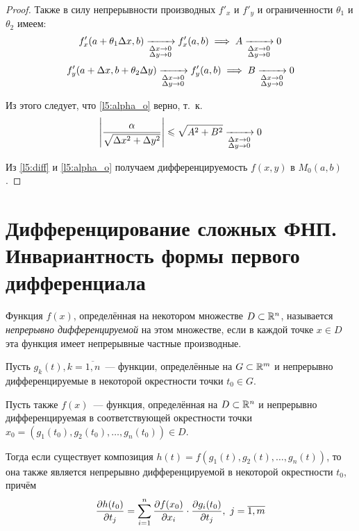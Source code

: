 \documentclass[../../main.tex]{subfiles}
\begin{document}
\begin{proof}
Также в силу непрерывности производных $f'_x$ и $f'_y$ 
и ограниченности $\theta_1$ и $\theta_2$ имеем:
\[f'_x(a+\theta_1\Delta x,b)\xrightarrow[\substack{\Delta x\to 0 \\
\Delta y \to 0}]{} f'_x(a,b)
\implies A \xrightarrow[\substack{\Delta x\to 0 \\
\Delta y \to 0}]{} 0\]
\[f'_y(a+\Delta x, b+\theta_2\Delta y) \xrightarrow[\substack{\Delta x\to 0 \\
\Delta y \to 0}]{} f'_y(a,b)
\implies B \xrightarrow[\substack{\Delta x\to 0 \\\Delta y \to 0}]{} 0\]

Из этого следует, что \eqref{l5:alpha_o} верно, т.~к.
\[\left|{\frac{\alpha}{\sqrt{\Delta x^2 + \Delta y^2}}}\right| \leqslant
\sqrt{A^2+B^2} \xrightarrow[\substack{\Delta x\to 0 \\
\Delta y \to 0}]{} 0\]

Из \eqref{l5:diff} и \eqref{l5:alpha_o} получаем дифференцируемость
$f(x,y)$ в $M_0(a,b)$.
\end{proof}

\section{Дифференцирование сложных ФНП. Инвариантность 
формы первого дифференциала}
\begin{defn}
Функция $f(x)$, определённая на некотором множестве $D\subset\mathbb{R}^n$,
называется \emph{непрерывно дифференцируемой} на 
этом множестве, если в каждой точке $x\in D$
 эта функция имеет непрерывные частные производные.
\end{defn}
\begin{thm}
Пусть $g_k(t),k=\overline{1,n}$~--- функции, определённые на 
$G\subset\mathbb{R}^m$ и непрерывно дифференцируемые в некоторой окрестности 
точки $t_0\in G$.

Пусть также $f(x)$~--- функция, определённая на $D\subset\mathbb{R}^n$ и
непрерывно дифференцируемая в соответствующей окрестности точки $x_0 = 
(g_1(t_0),g_2(t_0),\dots,g_n(t_0))\in D$.

Тогда если существует композиция $h(t) =
f(g_1(t),g_2(t),\dots,g_n(t))$, то она также является непрерывно 
дифференцируемой в некоторой окрестности $t_0$, причём
\[\frac{\partial h(t_0)}{\partial t_j}=\sum_{i=1}^{n}
\frac{\partial f(x_0)}{\partial x_i}\cdot
\frac{\partial g_i(t_0)}{\partial t_j},\ j=\overline{1,m}\]
\end{thm}
\end{document}
